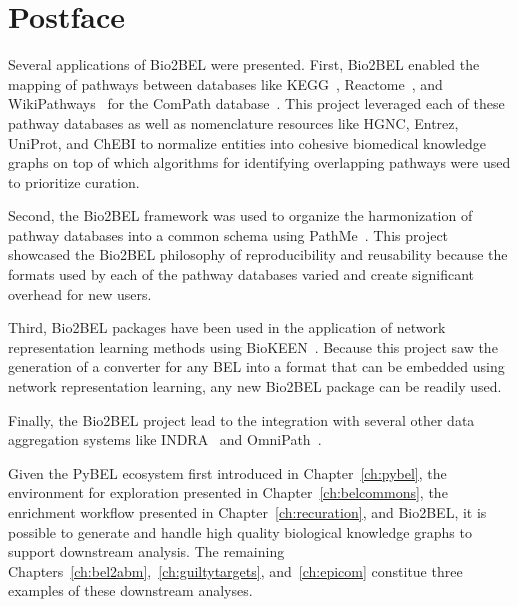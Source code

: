 \section*{Postface}

Several applications of Bio2BEL were presented.
First, Bio2BEL enabled the mapping of pathways between databases like \ac{KEGG}~\cite{Kanehisa2017}, Reactome~\cite{Fabregat2016}, and WikiPathways~\cite{Slenter2018} for the ComPath database~\cite{Domingo-Fernandez2018}.
This project leveraged each of these pathway databases as well as nomenclature resources like HGNC, Entrez, UniProt, and ChEBI to normalize entities into cohesive biomedical knowledge graphs on top of which algorithms for identifying overlapping pathways were used to prioritize curation.

Second, the Bio2BEL framework was used to organize the harmonization of pathway databases into a common schema using PathMe~\cite{Domingo-Fernandez2019a}.
This project showcased the Bio2BEL philosophy of reproducibility and reusability because the formats used by each of the pathway databases varied and create significant overhead for new users.

Third, Bio2BEL packages have been used in the application of network representation learning methods using BioKEEN~\cite{Ali2019}.
Because this project saw the generation of a converter for any \ac{BEL} into a format that can be embedded using network representation learning, any new Bio2BEL package can be readily used.

Finally, the Bio2BEL project lead to the integration with several other data aggregation systems like \ac{INDRA}~\cite{Gyori2017} and OmniPath~\cite{Turei2016}.

Given the PyBEL ecosystem first introduced in Chapter~\ref{ch:pybel}, the environment for exploration presented in Chapter~\ref{ch:belcommons}, the enrichment workflow presented in Chapter~\ref{ch:recuration}, and Bio2BEL, it is possible to generate and handle high quality biological knowledge graphs to support downstream analysis.
The remaining Chapters~\ref{ch:bel2abm},~\ref{ch:guiltytargets}, and~\ref{ch:epicom} constitue three examples of these downstream analyses.
